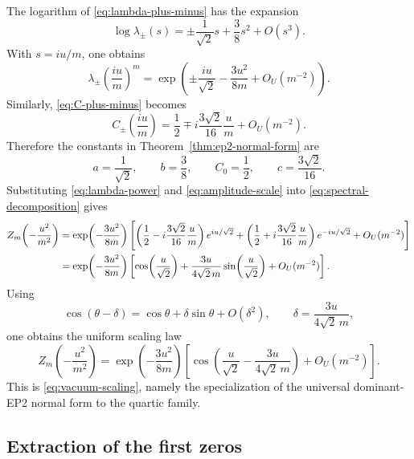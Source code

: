 The logarithm of \eqref{eq:lambda-plus-minus} has the expansion
\begin{equation}\label{eq:log-lambda-plus-minus}
\log \lambda_\pm(s)
=
\pm \frac{1}{\sqrt2}s+\frac38 s^2+O(s^3).
\end{equation}
With $s=iu/m$, one obtains
\begin{equation}\label{eq:lambda-power}
\lambda_\pm\!\left(\frac{iu}{m}\right)^m
=
\exp\!\left(
\pm \frac{iu}{\sqrt2}-\frac{3u^2}{8m}+O_U(m^{-2})
\right).
\end{equation}
Similarly, \eqref{eq:C-plus-minus} becomes
\begin{equation}\label{eq:amplitude-scale}
C_\pm\!\left(\frac{iu}{m}\right)
=
\frac12\mp i\frac{3\sqrt2}{16}\frac{u}{m}+O_U(m^{-2}).
\end{equation}
Therefore the constants in Theorem~\ref{thm:ep2-normal-form} are
\[
a=\frac{1}{\sqrt2},
\qquad
b=\frac38,
\qquad
C_0=\frac12,
\qquad
c=\frac{3\sqrt2}{16}.
\]
Substituting \eqref{eq:lambda-power} and \eqref{eq:amplitude-scale} into \eqref{eq:spectral-decomposition} gives
\begin{align}
Z_m\!\left(-\frac{u^2}{m^2}\right)
&=
\exp\!\left(-\frac{3u^2}{8m}\right)
\Biggl[
\left(\frac12-i\frac{3\sqrt2}{16}\frac{u}{m}\right)e^{iu/\sqrt2}
+\left(\frac12+i\frac{3\sqrt2}{16}\frac{u}{m}\right)e^{-iu/\sqrt2}
+O_U(m^{-2})
\Biggr] \notag\\
&=
\exp\!\left(-\frac{3u^2}{8m}\right)
\left[
\cos\!\left(\frac{u}{\sqrt2}\right)
+\frac{3u}{4\sqrt2\,m}\sin\!\left(\frac{u}{\sqrt2}\right)
+O_U(m^{-2})
\right].\label{eq:appendix-scaling}
\end{align}
Using
\[
\cos(\theta-\delta)=\cos\theta+\delta\sin\theta+O(\delta^2),
\qquad
\delta=\frac{3u}{4\sqrt2\,m},
\]
one obtains the uniform scaling law
\begin{equation}\label{eq:appendix-shifted-cosine}
Z_m\!\left(-\frac{u^2}{m^2}\right)
=
\exp\!\left(-\frac{3u^2}{8m}\right)
\left[
\cos\!\left(\frac{u}{\sqrt2}-\frac{3u}{4\sqrt2\,m}\right)
+ O_U(m^{-2})
\right].
\end{equation}
This is \eqref{eq:vacuum-scaling}, namely the specialization of the universal dominant-EP2 normal form to the quartic family.

\subsection{Extraction of the first zeros}

